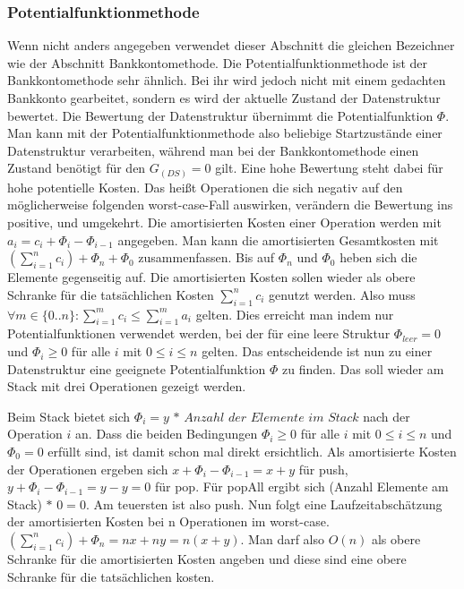 \documentclass[11pt, a4paper]{article}
\begin{document}
\subsubsection{Potentialfunktionmethode}
Wenn nicht anders angegeben verwendet dieser Abschnitt die gleichen Bezeichner wie der Abschnitt Bankkontomethode. Die Potentialfunktionmethode ist der Bankkontomethode sehr ähnlich. Bei ihr wird jedoch nicht mit einem gedachten Bankkonto gearbeitet, sondern es wird der aktuelle Zustand der Datenstruktur bewertet. Die Bewertung der Datenstruktur übernimmt die Potentialfunktion $\Phi$. Man kann mit der Potentialfunktionmethode also beliebige Startzustände einer Datenstruktur verarbeiten, während man bei der Bankkontomethode einen Zustand benötigt für den $G_(DS) = 0$ gilt. Eine hohe Bewertung steht dabei für hohe potentielle Kosten. Das heißt Operationen die sich negativ auf den möglicherweise folgenden worst-case-Fall auswirken, verändern die Bewertung ins positive, und umgekehrt. Die amortisierten Kosten einer Operation werden mit $a_{i} = c_{i} + \Phi_{i} - \Phi_{i-1}$   angegeben. Man kann die amortisierten Gesamtkosten mit $ (\sum \limits_{i=1}^n c_{i}) + \Phi_{n} + \Phi_{0}$ zusammenfassen. Bis auf $ \Phi_{n}$ und $ \Phi_{0}$ heben sich die Elemente gegenseitig auf. Die amortisierten Kosten sollen wieder als obere Schranke für die tatsächlichen Kosten $\sum \limits_{i=1}^n c_{i}$ genutzt werden. 
Also muss $\forall m \in \{0..n\}: \sum \limits_{i=1}^m c_{i} \leq \sum \limits_{i=1}^m a_{i} $ gelten. Dies erreicht man indem nur Potentialfunktionen verwendet werden, bei der für eine leere Struktur $\Phi_{leer} = 0$ und  $\Phi_{i} \geq 0$ für alle $i$ mit $0 \leq i \leq n$ gelten. Das entscheidende ist nun zu einer Datenstruktur eine geeignete Potentialfunktion $\Phi$ zu finden. Das soll wieder am Stack mit drei Operationen gezeigt werden. 

\noindent Beim Stack bietet sich $\Phi_{i} = y$  $*$ $Anzahl$ $der$ $Elemente$ $im$ $Stack$ nach der Operation $i$ an. Dass die beiden Bedingungen  $\Phi_{i} \geq 0$ für alle $i$ mit $0 \leq i \leq n$ und $\Phi_{0} = 0$ erfüllt sind, ist damit schon mal direkt ersichtlich. Als amortisierte Kosten der Operationen ergeben sich $x + \Phi_{i} - \Phi_{i-1} = x + y$ für push, 
$y + \Phi_{i} - \Phi_{i-1} = y - y = 0 $ für pop. Für popAll ergibt sich (Anzahl Elemente am Stack) $*$ $0 = 0$. Am teuersten ist also push. Nun folgt eine Laufzeitabschätzung der amortisierten Kosten bei n Operationen im worst-case. $(\sum \limits_{i=1}^n c_{i}) + \Phi_{n} = nx + ny = n(x+y)$. Man darf also $O(n)$ als obere Schranke für die amortisierten Kosten angeben und diese sind eine obere Schranke für die tatsächlichen kosten.
\end{document}
